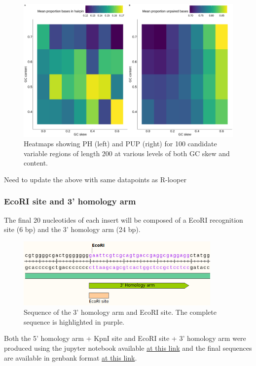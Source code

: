 \documentclass[11pt]{article}
\begin{document}
\begin{figure}[H]
	\includegraphics[width=14cm]{images/plots/rna_secondary_structure_temp.png}
	\centering
	\caption{Heatmaps showing PH (left) and PUP (right) for 100 candidate variable regions of length 200 at various levels of both GC skew and content.}
	\label{fig:3_prime_arm}
\end{figure}

Need to update the above with same datapoints as R-looper

\subsubsection{EcoRI site and 3' homology arm}

The final 20 nucleotides of each insert will be composed of a EcoRI recognition site (6 bp) and the 3' homology arm (24 bp). 

\begin{figure}[H]
	\includegraphics[width=10cm]{images/variable_region/3_homology_arm.png}
	\centering
	\caption{Sequence of the 3' homology arm and EcoRI site. The complete sequence is highlighted in purple.}
	\label{fig:3_prime_arm}
\end{figure}

Both the 5' homology arm + KpnI site and EcoRI site + 3' homology arm were produced using the jupyter notebook available \href{https://github.com/EthanHolleman/plasmid-VR-design/blob/main/notes/homology_arms.ipynb}{at this link} and the final sequences are available in genbank format \href{https://github.com/EthanHolleman/plasmid-VR-design/tree/main/resources/files/genbank}{at this link}.
\end{document}
